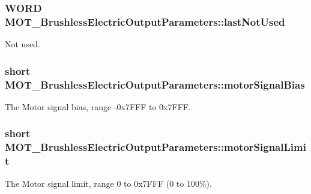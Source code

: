 \subsubsection[{\texorpdfstring{last\+Not\+Used}{lastNotUsed}}]{\setlength{\rightskip}{0pt plus 5cm}W\+O\+RD M\+O\+T\+\_\+\+Brushless\+Electric\+Output\+Parameters\+::last\+Not\+Used}\hypertarget{struct_m_o_t___brushless_electric_output_parameters_a4cf8c2263c04b073d89f606a901d1fe7}{}\label{struct_m_o_t___brushless_electric_output_parameters_a4cf8c2263c04b073d89f606a901d1fe7}


Not used. 

\subsubsection[{\texorpdfstring{motor\+Signal\+Bias}{motorSignalBias}}]{\setlength{\rightskip}{0pt plus 5cm}short M\+O\+T\+\_\+\+Brushless\+Electric\+Output\+Parameters\+::motor\+Signal\+Bias}\hypertarget{struct_m_o_t___brushless_electric_output_parameters_a6e0a67140b181995f4c7a758a3713fa7}{}\label{struct_m_o_t___brushless_electric_output_parameters_a6e0a67140b181995f4c7a758a3713fa7}


The Motor signal bias, range -\/0x7\+F\+FF to 0x7\+F\+FF. 

\subsubsection[{\texorpdfstring{motor\+Signal\+Limit}{motorSignalLimit}}]{\setlength{\rightskip}{0pt plus 5cm}short M\+O\+T\+\_\+\+Brushless\+Electric\+Output\+Parameters\+::motor\+Signal\+Limit}\hypertarget{struct_m_o_t___brushless_electric_output_parameters_a607a548bb74117502c1ff6bfb53888ba}{}\label{struct_m_o_t___brushless_electric_output_parameters_a607a548bb74117502c1ff6bfb53888ba}


The Motor signal limit, range 0 to 0x7\+F\+FF (0 to 100\%). 

